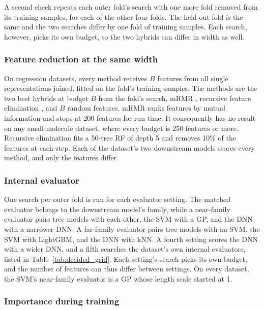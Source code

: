 A second check repeats each outer fold's search with one more fold removed from its training samples, for each of the other four folds. The held-out fold is the same and the two searches differ by one fold of training samples. Each search, however, picks its own budget, so the two hybrids can differ in width as well.

\subsubsection{Feature reduction at the same width}

On regression datasets, every method receives $B$ features from all single representations joined, fitted on the fold's training samples. The methods are the two best hybrids at budget $B$ from the fold's search, mRMR \citep{Peng2005}, recursive feature elimination \citep{Guyon2002}, and $B$ random features. mRMR ranks features by mutual information and stops at 200 features for run time. It consequently has no result on any small-molecule dataset, where every budget is 250 features or more. Recursive elimination fits a 50-tree RF of depth 5 and removes 10\% of the features at each step. Each of the dataset's two downstream models scores every method, and only the features differ.

\subsubsection{Internal evaluator}

One search per outer fold is run for each evaluator setting. The matched evaluator belongs to the downstream model's family, while a near-family evaluator pairs tree models with each other, the SVM with a GP, and the DNN with a narrower DNN. A far-family evaluator pairs tree models with an SVM, the SVM with LightGBM, and the DNN with kNN. A fourth setting scores the DNN with a wider DNN, and a fifth searches the dataset's own internal evaluators, listed in Table~\ref{tab:decided_grid}. Each setting's search picks its own budget, and the number of features can thus differ between settings. On every dataset, the SVM's near-family evaluator is a GP whose length scale started at 1. 

\subsubsection{Importance during training}


